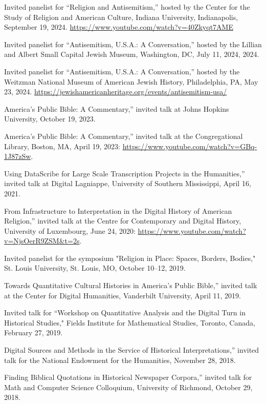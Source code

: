 \documentclass[11pt]{article}
\begin{document}
Invited panelist for ``Religion and Antisemitism,'' hosted by the Center for the Study of Religion and American Culture, Indiana University, Indianapolis, September 19, 2024. \url{https://www.youtube.com/watch?v=40Zkyqt7AME}

Invited panelist for ``Antisemitism, U.S.A.: A Conversation,'' hosted by the 
Lillian and Albert Small Capital Jewish Museum, Washington, DC, July 11, 2024, 
2024. 

Invited panelist for ``Antisemitism, U.S.A.: A Conversation,'' hosted by the 
Weitzman National Museum of American Jewish History, Philadelphia, PA, May 23, 
2024. \url{https://jewishamericanheritage.org/events/antisemitism-usa/}

\noindent{}America's Public Bible: A Commentary,'' invited talk at Johns 
Hopkins University, October 19, 2023.

\noindent{}America's Public Bible: A Commentary,'' invited talk at the Congregational Library, Boston, MA, April 19, 2023: \url{https://www.youtube.com/watch?v=GBq-1J87zSw}.

\noindent{}Using DataScribe for Large Scale Transcription Projects in the Humanities,'' invited talk at Digital Lagniappe, University of Southern Mississippi, April 16, 2021.

\noindent{}From Infrastructure to Interpretation in the Digital History of American Religion,'' invited talk at the Centre for Contemporary and Digital History, University of Luxembourg, June 24, 2020: \url{https://www.youtube.com/watch?v=NjsOerR9ZSM&t=2s}.

Invited panelist for the symposium "Religion in Place: Spaces, Borders, Bodies," St. Louis University, St. Louis, MO, October 10--12, 2019.

\noindent{}Towards Quantitative Cultural Histories in America's Public Bible,'' invited talk at the Center for Digital Humanities, Vanderbilt University, April 11, 2019.

Invited talk for ``Workshop on Quantitative Analysis and the Digital Turn in Historical Studies," Fields Institute for Mathematical Studies, Toronto, Canada, February 27, 2019.

\noindent{}Digital Sources and Methods in the Service of Historical Interpretations,'' invited talk for the National Endowment for the Humanities, November 28, 2018.

\noindent{}Finding Biblical Quotations in Historical Newspaper Corpora,'' invited talk for Math and Computer Science Colloquium, University of Richmond, October 29, 2018.
\end{document}
